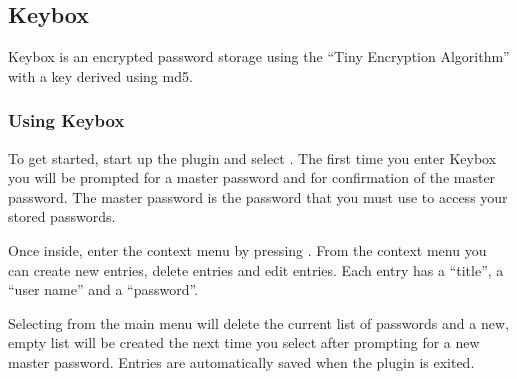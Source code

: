 \subsection{Keybox}
Keybox is an encrypted password storage using the ``Tiny Encryption Algorithm''
with a key derived using md5.

\subsubsection{Using Keybox}
To get started, start up the plugin and select .
The first time you enter Keybox you will be prompted for a master password
and for confirmation of the master password. The master password is the
password that you must use to access your stored passwords.

Once inside, enter the context menu by pressing \ActionStdContext.
From the context menu you can create new entries, delete entries and edit entries.
Each entry has a ``title'', a ``user name'' and a ``password''.

Selecting  from the main menu will delete the current
list of passwords and a new, empty list will be created the next time you
select  after prompting for a new master password.
Entries are automatically saved when the plugin is exited.
